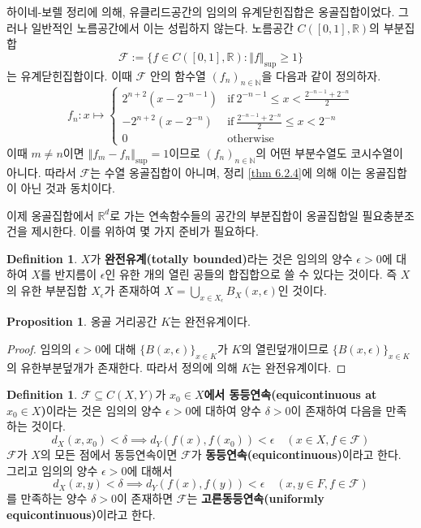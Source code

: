 \documentclass[11pt]{book}
\numberwithin{equation}{chapter}
\def\NN{\mathbb{N}}
\def\RR{\mathbb{R}}
\def\eps{\epsilon}
\def\calF{\mathcal{F}}
\newcommand{\norm}[1]{\left\Vert#1\right\Vert}
\def\textif{\text{if}}
\def\otw{\text{otherwise}}
\theoremstyle{definition}
\newtheorem{prop}[thm]{Proposition}
\newtheorem{defn}[thm]{Definition}
\begin{document}
하이네-보렐 정리에 의해, 유클리드공간의 임의의 유계닫힌집합은 옹골집합이었다. 그러나 일반적인 노름공간에서 이는 성립하지 않는다. 노름공간 \(C([0, 1], \RR)\)의 부분집합
\[
    \calF := \{f \in C([0, 1], \RR) : \norm{f}_{\sup} \ge 1\}    
\]
는 유계닫힌집합이다. 이때 \(\calF\) 안의 함수열 \((f_n)_{n \in \NN}\)을 다음과 같이 정의하자.
\[
f_n : x \mapsto \begin{cases}
    2^{n+2}(x - 2^{-n-1}) &\textif \ 2^{-n-1} \le x < \frac{2^{-n-1} + 2^{-n}}{2}\\
    -2^{n+2}(x - 2^{-n}) &\textif \ \frac{2^{-n-1} + 2^{-n}}{2} \le x < 2^{-n}\\
    0 &\otw
\end{cases}    
\]
이때 \(m \ne n\)이면 \(\norm{f_m - f_n}_{\sup} = 1\)이므로 \((f_n)_{n \in \NN}\)의 어떤 부분수열도 코시수열이 아니다. 따라서 \(\calF\)는 수열 옹골집합이 아니며, 정리 \ref{thm 6.2.4}에 의해 이는 옹골집합이 아닌 것과 동치이다.

이제 옹골집합에서 \(\RR^d\)로 가는 연속함수들의 공간의 부분집합이 옹골집합일 필요충분조건을 제시한다. 이를 위하여 몇 가지 준비가 필요하다.

\begin{defn}
    \(X\)가 \textbf{완전유계(totally bounded)}라는 것은 임의의 양수 \(\eps > 0\)에 대하여 \(X\)를 반지름이 \(\eps\)인 유한 개의 열린 공들의 합집합으로 쓸 수 있다는 것이다. 즉 \(X\)의 유한 부분집합 \(X_{\eps}\)가 존재하여 \(X = \bigcup_{x \in X_{\eps}} B_X(x, \eps)\)인 것이다.
\end{defn}


\begin{prop} \label{10.2.2}
    옹골 거리공간 \(K\)는 완전유계이다.
\end{prop}
\begin{proof}
    임의의 \(\eps > 0\)에 대해 \(\{B(x, \eps)\}_{x \in K}\)가 \(K\)의 열린덮개이므로 \(\{B(x, \eps)\}_{x \in K}\)의 유한부분덮개가 존재한다. 따라서 정의에 의해 \(K\)는 완전유계이다.
\end{proof}

\begin{defn}
    \(\calF \subseteq C(X, Y)\)가 \textbf{\(x_0 \in X\)에서 동등연속(equicontinuous at \(x_0 \in X\))}이라는 것은 임의의 양수 \(\eps > 0\)에 대하여 양수 \(\delta > 0\)이 존재하여 다음을 만족하는 것이다.
    \[
    d_X(x, x_0) < \delta \implies d_Y(f(x), f(x_0)) < \eps \quad (x \in X, f \in \calF)    
    \]
    \(\calF\)가 \(X\)의 모든 점에서 동등연속이면 \(\calF\)가 \textbf{동등연속(equicontinuous)}이라고 한다. 그리고 임의의 양수 \(\eps > 0\)에 대해서
    \[
    d_X(x, y) < \delta \implies d_Y(f(x), f(y)) < \eps \quad (x, y \in F, f \in \calF)    
    \]
    를 만족하는 양수 \(\delta > 0\)이 존재하면 \(\calF\)는 \textbf{고른동등연속(uniformly equicontinuous)}이라고 한다. 
\end{defn}
\end{document}
